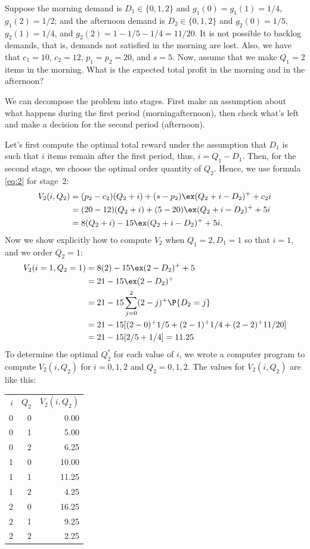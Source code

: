 \begin{question}
Suppose the morning demand is $D_1\in \{0,1,2\}$ and $g_1(0)=g_1(1)=1/4$, $g_1(2)=1/2$; and the afternoon demand is $D_2\in \{0,1, 2\}$ and $g_2(0)=1/5$, $g_2(1)=1/4$, and $g_2(2)=1-1/5 - 1/4=11/20$. It is not possible to backlog demands, that is,  demands not satisfied in the morning are lost. Also, we have that $c_1=10$, $c_2=12$, $p_1=p_2=20$, and $s=5$. Now, assume that we make $Q_1=2$ items in the morning. What is the expected total profit in the morning and in the afternoon?  
\begin{solution}
We can decompose the problem into stages. First make an assumption about what happens during the first period (morningafternoon), then check what's left and make a decision for the second period (afternoon). 

Let's first compute the optimal total reward under the assumption that
$D_1$ is such that $i$ items remain after the first period, thus,
$i=Q_1 - D_1$.  Then, for the second stage, we  choose the
optimal order quantity of $Q_2$. Hence, we use formula \eqref{eq:2} for stage~2:
\begin{equation*}
  \begin{split}
V_2(i, Q_2) 
&= (p_2-c_2)(Q_2+i) + (s-p_2)\ex (Q_2+i-D_2)^+ + c_2i \\
&= (20-12)(Q_2+i) + (5-20)\ex (Q_2+i-D_2)^+ + 5i \\
&= 8(Q_2+i) -15 \ex (Q_2+i-D_2)^+ + 5i.
  \end{split}
\end{equation*}
Now we show explicitly how to compute $V_2$ when $Q_1=2, D_1=1$ so that $i=1$, and we order $Q_2=1$: 
\begin{equation*}
  \begin{split}
V_2(i=1,Q_2=1) 
&= 8(2) -15 \ex (2-D_2)^+ + 5\\
&= 21  -15 \ex (2-D_2)^+ \\
&= 21  - 15 \sum_{j=0}^2 (2-j)^+ \P{D_2 = j}  \\
&= 21  - 15 [(2-0)^+ 1/5 + (2-1)^+ 1/4+ (2-2)^+11/20] \\
&= 21  - 15 [2/5 + 1/4] = 11.25
  \end{split}
\end{equation*}
To determine the optimal $Q_2^*$ for each value of $i$,  we wrote a computer program to compute $V_2(i, Q_2)$ for $i=0,1,2$ and $Q_2=0,1,2$. The values for $V_2(i, Q_2)$ are like this:
\begin{center}
\begin{tabular}{rrr}
$i$ & $Q_2$ & $V_2(i, Q_2)$ \\
0 & 0 & 0.00 \\
0 & 1 & 5.00 \\
0 & 2 & 6.25 \\
1 & 0 & 10.00 \\
1 & 1 & 11.25 \\
1 & 2 & 4.25 \\
2 & 0 & 16.25 \\
2 & 1 & 9.25 \\
2 & 2 & 2.25 \\
\end{tabular}
\end{center}


\end{solution}
\end{question}
